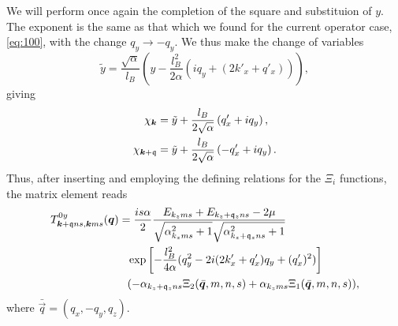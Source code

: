 We will perform once again the completion of the square and substituion of \(y\).
The exponent is the same as that which we found for the current operator case, \cref{eq:100}, with the change \(q_{y} \to - q_{y}\).
We thus make the change of variables
\begin{equation}
  \label{eq:110}
  \tilde{y} = \frac{\sqrt{\alpha}}{l_{B}} \left(y  - \frac{l_{B}^2}{2 \alpha } (i q_{y} + (2k' _x + q' _x) )\right),
\end{equation}
giving
\begin{align}
  \chi _{\bm{k}} &= \tilde{y} + \frac{l_{B}}{2 \sqrt{\alpha }} \left( q'_x + i q_{y}\right),\\
  \chi _{\bm{k} + \mathfrak{q}} &= \tilde{y} + \frac{l_{B}}{2 \sqrt{\alpha }} \left( -q' _{x} + i q_{y}\right).
\end{align}
Thus, after inserting and employing the defining relations for the \( \Xi_i \) functions, the matrix element reads
\begin{align}
  T_{\vec{k} + \qvec{q} n s, \vec{k} m s}^{0y} (\vec{q}) &=
  \frac{is \alpha }{2 }
  \frac{E_{k_z m s} + E_{k_z + \qvec{q}_z n s} - 2 \mu}{
    \sqrt{\alpha_{k_z m s}^2 + 1}
    \sqrt{\alpha_{k_z + \qvec{q}_z n s}^2 + 1}
  }\\
  &\pe \exp \left[
    -\frac{l_{B}^2}{4 \alpha } (q_{y}^2 - 2i ( 2k' _x + q' _x ) q_{y} + (q' _x)^2)
  \right  ]\\
  &\pe (-\alpha_{k_z + \qvec{q}_z n s} \Xi_{2} (\bar{\vec{q}}, m, n, s) + \alpha_{k_z m s} \Xi_{1}(\bar{\vec{q}}, m, n, s)),
\end{align}
where \(\bar{\vec{q}} = (q_{x}, -q_{y}, q_{z})\).

